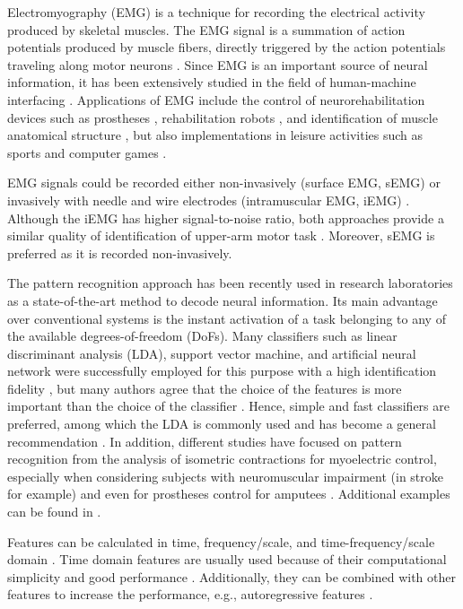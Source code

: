 Electromyography (EMG) is a technique for recording the electrical activity produced by skeletal muscles. The EMG signal is a summation of action potentials produced by muscle fibers, directly triggered by the action potentials traveling along motor neurons \citep{Farina2010}. Since EMG is an important source of neural information, it has been extensively studied in the field of human-machine interfacing  \citep{Nazmi2016, Hakonen2015}. Applications of EMG include the control of neurorehabilitation devices such as prostheses \citep{Parker2006, Li2010}, rehabilitation robots \citep{Marchal-Crespo2009, Boccard2014}, and identification of muscle anatomical structure \citep{Marateb2016}, but also implementations in leisure activities such as sports \citep{Verikas2016} and computer games \citep{vanDijk2016}.

EMG signals could be recorded either non-invasively (surface EMG, sEMG) or invasively with needle and wire electrodes (intramuscular EMG, iEMG) \citep{Marateb1999}. Although the iEMG has higher signal-to-noise ratio, both approaches provide a similar quality of identification of upper-arm motor task \citep{Hargrove2007}. Moreover, sEMG is preferred as it is recorded non-invasively.

The pattern recognition approach has been recently used in research laboratories as a state-of-the-art method to decode neural information. Its main advantage over conventional systems is the instant activation of a task belonging to any of the available degrees-of-freedom (DoFs). Many classifiers such as linear discriminant analysis (LDA), support vector machine, and artificial neural network were successfully employed for this purpose with a high identification fidelity \citep{Oskoei2007}, but many authors agree that the choice of the features is more important than the choice of the classifier \citep{Hargrove2007}. Hence, simple and fast classifiers are preferred, among which the LDA is commonly used and has become a general recommendation \citep{Hakonen2015, Huang2009}. In addition, different studies have focused on pattern recognition from the analysis of isometric contractions for myoelectric control, especially when considering subjects with neuromuscular impairment (in stroke for example) \citep{Celadon2016} and even for prostheses control for amputees \citep{Ameri2012}. Additional examples can be found in \citep{Li2013, Jordanic2016a, Jordanic2016b}.

Features can be calculated in time, frequency/scale, and time-frequency/scale domain \citep{Nazmi2016, Hakonen2015, Oskoei2007}. Time domain features are usually used because of their computational simplicity and good performance \citep{Hakonen2015}. Additionally, they can be combined with other features to increase the performance, e.g., autoregressive features \citep{Hargrove2007}.

